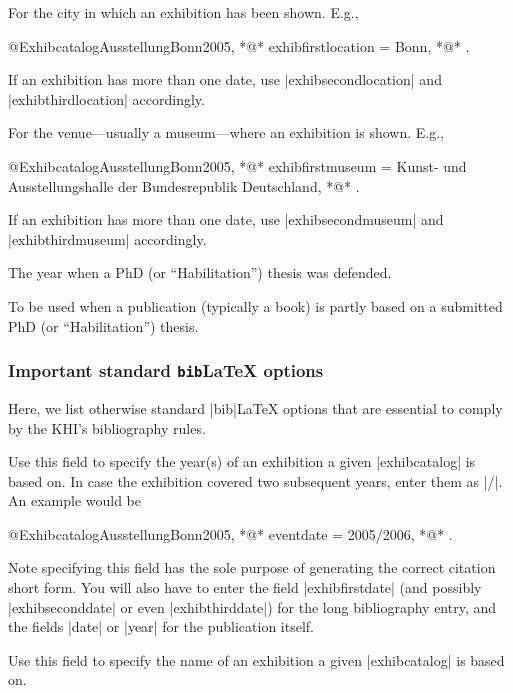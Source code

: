\documentclass[a4paper,
10pt,
ngerman,
english
]{ltxdoc}
\begin{document}
For the city in which an exhibition has been shown. E.g.,
\begin{code}
@Exhibcatalog{AusstellungBonn2005,
  *@\ldots@*
  exhibfirstlocation = {Bonn},
  *@\ldots@*
}.
\end{code}
If an exhibition has more than one date, use |exhibsecondlocation| and |exhibthirdlocation| accordingly.

For the venue---usually a museum---where an exhibition is shown. E.g.,
\begin{code}
@Exhibcatalog{AusstellungBonn2005,
  *@\ldots@*
  exhibfirstmuseum = {Kunst- und Ausstellungshalle der Bundesrepublik Deutschland},
  *@\ldots@*
}.
\end{code}
If an exhibition has more than one date, use |exhibsecondmuseum| and |exhibthirdmuseum| accordingly.

The year when a PhD (or \enquote{Habilitation}) thesis was defended.

To be used when a publication (typically a book) is partly based on a submitted PhD (or \enquote{Habilitation}) thesis.


\subsubsection{Important standard \texttt{bib}\LaTeX{} options}\label{sec:bibl-efields}
Here, we list otherwise standard |bib|\LaTeX{} options that are essential to comply by the KHI's bibliography rules.

Use this field to specify the year(s) of an exhibition a given |exhibcatalog| is based on. In case the exhibition covered two subsequent years, enter them as |/|. An example would be
\begin{code}
@Exhibcatalog{AusstellungBonn2005,
  *@\ldots@*
  eventdate = {2005/2006},
  *@\ldots@*
}.
\end{code}
Note specifying this field has the sole purpose of generating the correct citation short form.
You will also have to enter the field |exhibfirstdate| (and possibly |exhibseconddate| or even |exhibthirddate|) for the long bibliography entry, and the fields |date| or |year| for the publication itself. 

Use this field to specify the name of an exhibition a given |exhibcatalog| is based on.
\end{document}
